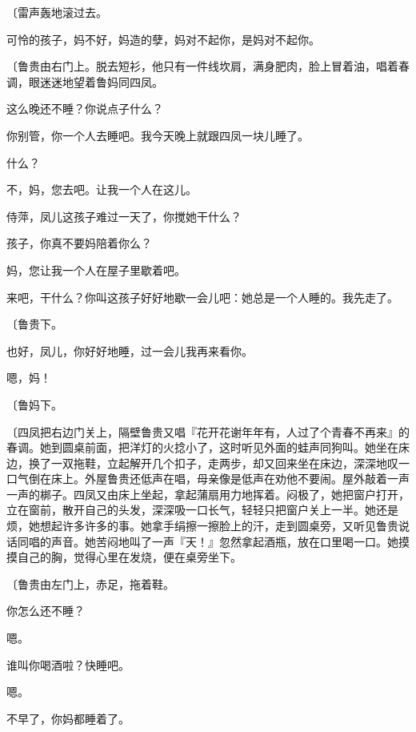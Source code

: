 {\fangsong〔雷声轰地滚过去。}

可怜的孩子，妈不好，妈造的孽，妈对不起你，是妈对不起你。

{\fangsong〔鲁贵由右门上。脱去短衫，他只有一件线坎肩，满身肥肉，脸上冒着油，唱着春调，眼迷迷地望着鲁妈同四凤。}

这么晚还不睡？你说点子什么？

你别管，你一个人去睡吧。我今天晚上就跟四凤一块儿睡了。

什么？

不，妈，您去吧。让我一个人在这儿。

侍萍，凤儿这孩子难过一天了，你搅她干什么？

孩子，你真不要妈陪着你么？

妈，您让我一个人在屋子里歇着吧。

来吧，干什么？你叫这孩子好好地歇一会儿吧：她总是一个人睡的。我先走了。

{\fangsong〔鲁贵下。}

也好，凤儿，你好好地睡，过一会儿我再来看你。

嗯，妈！

{\fangsong〔鲁妈下。}

{\fangsong〔四凤把右边门关上，隔壁鲁贵又唱『花开花谢年年有，人过了个青春不再来』的春调。她到圆桌前面，把洋灯的火捻小了，这时听见外面的蛙声同狗叫。她坐在床边，换了一双拖鞋，立起解开几个扣子，走两步，却又回来坐在床边，深深地叹一口气倒在床上。外屋鲁贵还低声在唱，母亲像是低声在劝他不要闹。屋外敲着一声一声的梆子。四凤又由床上坐起，拿起蒲扇用力地挥着。闷极了，她把窗户打开，立在窗前，散开自己的头发，深深吸一口长气，轻轻只把窗户关上一半。她还是烦，她想起许多许多的事。她拿手绢擦一擦脸上的汗，走到圆桌旁，又听见鲁贵说话同唱的声音。她苦闷地叫了一声『天！』忽然拿起酒瓶，放在口里喝一口。她摸摸自己的胸，觉得心里在发烧，便在桌旁坐下。}

{\fangsong〔鲁贵由左门上，赤足，拖着鞋。}

你怎么还不睡？

嗯。

谁叫你喝酒啦？快睡吧。

嗯。

不早了，你妈都睡着了。

